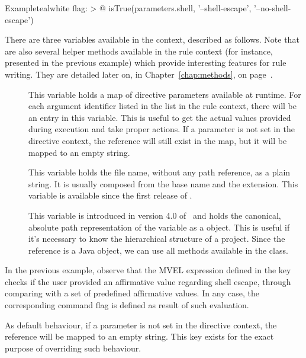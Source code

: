 \begin{description}
\begin{description}
\begin{codebox}{Example}{teal}{\icnote}{white}
flag: >
  @{
      isTrue(parameters.shell, '--shell-escape',
             '--no-shell-escape')
  }
\end{codebox}

There are three variables available in the  context, described as follows. Note that are also several helper methods available in the rule context (for instance,  presented in the previous example) which provide interesting features for rule writing. They are detailed later on, in Chapter~\ref{chap:methods}, on page~\pageref{chap:methods}.

\begin{description}
\item[] This variable holds a map of directive parameters available at runtime. For each argument identifier listed in the  list in the rule context, there will be an entry in this variable. This is useful to get the actual values provided during execution and take proper actions. If a parameter is not set in the directive context, the reference will still exist in the map, but it will be mapped to an empty string.

\item[] This variable holds the file name, without any path reference, as a plain string. It is usually composed from the base name and the extension. This variable is available since the first release of \arara.

\item[] This variable is introduced in version 4.0 of \arara\ and holds the canonical, absolute path representation of the  variable as a  object. This is useful if it's necessary to know the hierarchical structure of a project. Since the reference is a Java object, we can use all methods available in the  class.
\end{description}

In the previous example, observe that the \gls{MVEL} expression defined in the  key checks if the user provided an affirmative value regarding shell escape, through comparing  with a set of predefined affirmative values. In any case, the corresponding command flag is defined as result of such evaluation.

\item[\describecontext{O}{arguments}{default}] As default behaviour, if a parameter is not set in the directive context, the reference will be mapped to an empty string. This key exists for the exact purpose of overriding such behaviour.


\end{description}
\end{description}
